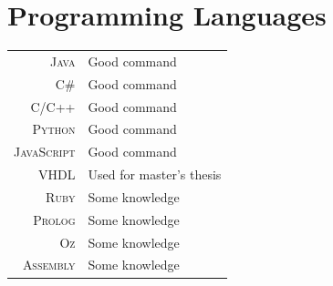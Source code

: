 \documentclass[a4paper,10pt]{article}
\begin{document}

\section{Programming Languages}
\begin{longtable}[l]{rl}
 \textsc{Java} & Good command \\
 \textsc{C\#} & Good command \\
 \textsc{C/C++} & Good command \\
 \textsc{Python} & Good command \\
 \textsc{JavaScript} & Good command \\
 \textsc{VHDL} & Used for master's thesis \\
 \textsc{Ruby} & Some knowledge \\
 \textsc{Prolog} & Some knowledge \\
 \textsc{Oz} & Some knowledge \\
 \textsc{Assembly} & Some knowledge \\
\end{longtable}

\end{document}
